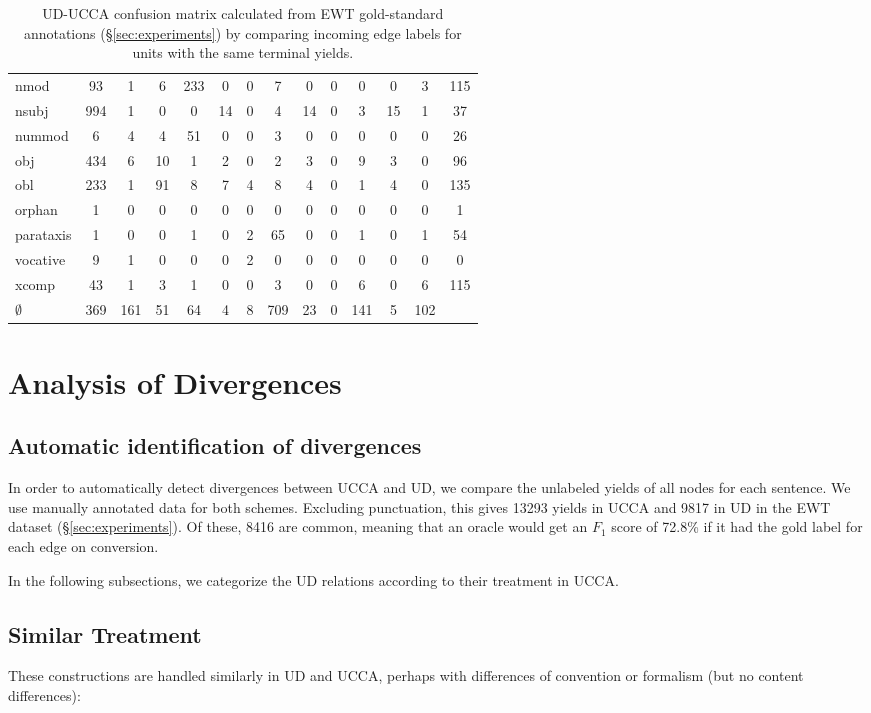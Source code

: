 \documentclass[11pt,a4paper]{article}
\begin{document}
\begin{table}[t]
\begin{tabular}{l|ccccccccccccc}
nmod & 93 & 1 & 6 & 233 & 0 & 0 & 7 & 0 & 0 & 0 & 0 & 3 & 115 \\
nsubj & 994 & 1 & 0 & 0 & 14 & 0 & 4 & 14 & 0 & 3 & 15 & 1 & 37 \\
nummod & 6 & 4 & 4 & 51 & 0 & 0 & 3 & 0 & 0 & 0 & 0 & 0 & 26 \\
obj & 434 & 6 & 10 & 1 & 2 & 0 & 2 & 3 & 0 & 9 & 3 & 0 & 96 \\
obl & 233 & 1 & 91 & 8 & 7 & 4 & 8 & 4 & 0 & 1 & 4 & 0 & 135 \\
orphan & 1 & 0 & 0 & 0 & 0 & 0 & 0 & 0 & 0 & 0 & 0 & 0 & 1 \\
parataxis & 1 & 0 & 0 & 1 & 0 & 2 & 65 & 0 & 0 & 1 & 0 & 1 & 54 \\
vocative & 9 & 1 & 0 & 0 & 0 & 2 & 0 & 0 & 0 & 0 & 0 & 0 & 0 \\
xcomp & 43 & 1 & 3 & 1 & 0 & 0 & 3 & 0 & 0 & 6 & 0 & 6 & 115 \\
$\emptyset$ & 369 & 161 & 51 & 64 & 4 & 8 & 709 & 23 & 0 & 141 & 5 & 102 & 
\end{tabular}
\caption{UD-UCCA confusion matrix calculated from EWT
gold-standard annotations (\S\ref{sec:experiments})
by comparing incoming edge labels for units with the same terminal yields.
\label{tab:confusion_matrix}}
\end{table}



\section{Analysis of Divergences}\label{sec:analysis}


\subsection{Automatic identification of divergences}

In order to automatically detect divergences between UCCA and UD,
we compare the unlabeled yields of all nodes for each sentence.
We use manually annotated data for both schemes.
Excluding punctuation, this gives 13293 yields in UCCA and
9817 in UD in the EWT dataset (\S\ref{sec:experiments}).
Of these, 8416 are common, meaning that an oracle would get an $F_1$ score
of 72.8\% if it had the gold label for each edge on conversion.

In the following subsections, we categorize the UD relations according to their
treatment in UCCA.


\subsection{Similar Treatment}
These constructions are handled similarly in UD and UCCA,
perhaps with differences of convention or formalism (but no content differences):
\end{document}
